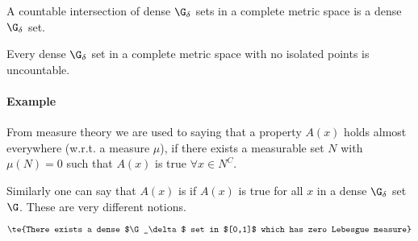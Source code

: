 \begin{cor}\label{v.3}
	A countable intersection of dense $\G_\delta$ sets in a complete metric space is a dense $\G_\delta$ set.
\end{cor}

\begin{cor}\label{v.4}
	Every dense $\G_\delta$ set in a complete metric space with no isolated points is uncountable.
\end{cor}

\paragraph{Example}
From measure theory we are used to saying that a property $A(x)$ holds almost everywhere (w.r.t. a measure $\mu$), if there exists a measurable set $N$ with $\mu(N)=0$ such that $A(x)$ is true $\forall x\in N^C$.

Similarly one can say that $A(x)$ is  if $A(x)$ is true for all $x$ in a dense $\G_\delta$ set $\G$. These are very different notions. 

\[\te{There exists a dense $\G_\delta$ set in $[0,1]$ which has zero Lebesgue measure}\]
